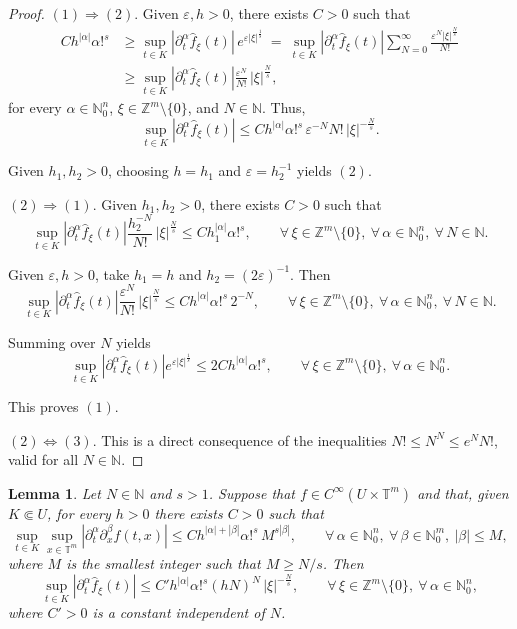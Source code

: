 \documentclass[11pt,reqno]{amsart}
\numberwithin{equation}{section}
\newtheorem{lemma}[theorem]{Lemma}
\begin{document}
\begin{proof}
	\noindent
	\((1)\Rightarrow(2)\).
	Given \(\varepsilon,h>0\), there exists \(C>0\) such that
	\begin{align*}
		Ch^{|\alpha|}\alpha!^s
		&\geq
		\sup_{t\in K}|\partial_t^\alpha\widehat{f}_\xi(t)|\,e^{\varepsilon|\xi|^{\frac{1}{s}}}\ =\ 
		\sup_{t\in K}|\partial_t^\alpha\widehat{f}_\xi(t)|
		\sum_{N=0}^{\infty}\frac{\varepsilon^N|\xi|^{\frac{N}{s}}}{N!}\\
		&\geq
		\sup_{t\in K}|\partial_t^\alpha\widehat{f}_\xi(t)|
		\frac{\varepsilon^{N}}{N!}\,|\xi|^{\frac{N}{s}},
	\end{align*}
	for every \(\alpha\in\mathbb{N}_0^n\), \(\xi\in\mathbb{Z}^m\setminus\{0\}\), and \(N\in\mathbb{N}\).
	Thus,
	\[
	\sup_{t\in K}|\partial_t^\alpha\widehat{f}_\xi(t)|
	\leq
	Ch^{|\alpha|}\alpha!^s\, \varepsilon^{-N}N!\,|\xi|^{-\frac{N}{s}}.
	\]
	
	Given \(h_1,h_2>0\), choosing \(h=h_1\) and \(\varepsilon=h_2^{-1}\) yields \((2)\).
	
	\medskip
	\noindent
	\((2)\Rightarrow(1)\).
	Given \(h_1,h_2>0\), there exists \(C>0\) such that
	\[
	\sup_{t\in K}|\partial_t^\alpha\widehat{f}_\xi(t)|
	\frac{h_2^{-N}}{N!}\,|\xi|^{\frac{N}{s}}
	\leq
	Ch_1^{|\alpha|}\alpha!^s,\qquad\forall\,\xi\in\mathbb{Z}^m\setminus\{0\},\ \forall\,\alpha\in\mathbb{N}_0^n,\ \forall\, N\in\mathbb{N}.
	\]
	
	Given \(\varepsilon,h>0\), take \(h_1=h\) and \(h_2=(2\varepsilon)^{-1}\). Then
	\[
	\sup_{t\in K}|\partial_t^\alpha\widehat{f}_\xi(t)|
	\frac{\varepsilon^{N}}{N!}\,|\xi|^{\frac{N}{s}}
	\leq
	Ch^{|\alpha|}\alpha!^s\,2^{-N},\qquad\forall\,\xi\in\mathbb{Z}^m\setminus\{0\},\ \forall\,\alpha\in\mathbb{N}_0^n,\ \forall\, N\in\mathbb{N}.
	\]
	
	Summing over \(N\) yields
	\[
	\sup_{t\in K}|\partial_t^\alpha\widehat{f}_\xi(t)|
	e^{\varepsilon|\xi|^{\frac{1}{s}}}
	\leq
	2Ch^{|\alpha|}\alpha!^s,\qquad\forall\,\xi\in\mathbb{Z}^m\setminus\{0\},\ \forall\,\alpha\in\mathbb{N}_0^n.
	\]
	
	This proves \((1)\).
	
	\medskip
	\noindent
	\((2)\Leftrightarrow(3)\).
	This is a direct consequence of the inequalities
	\(N!\leq N^N \leq e^N N!\), valid for all \(N\in\mathbb{N}\).
\end{proof}

\begin{lemma}\label{lemma_fourier_aux_b}
	Let \(N\in\mathbb{N}\) and \(s>1\).
	Suppose that \(f\in C^\infty(U\times\mathbb{T}^m)\) and that, given \(K\Subset U\), for every \(h>0\) there exists \(C>0\) such that
	\[
	\sup_{t\in K}\sup_{x\in\mathbb{T}^m}|\partial_t^\alpha\partial_x^\beta f(t,x)|
	\leq
	Ch^{|\alpha|+|\beta|}\alpha!^s\, M^{s|\beta|},\qquad \forall\,\alpha\in\mathbb{N}_0^n,\ \forall\,\beta\in\mathbb{N}_0^m,\ |\beta|\leq M,
	\]
	where \(M\) is the smallest integer such that \(M\geq N/s\). Then
	\[
	\sup_{t\in K}|\partial_t^\alpha\widehat{f}_\xi(t)|
	\leq
	C'h^{|\alpha|}\alpha!^s (hN)^N\, |\xi|^{-\frac{N}{s}},\qquad \forall\,\xi\in\mathbb{Z}^m\setminus\{0\},\  \forall\,\alpha\in\mathbb{N}_0^n,
	\]
	where \(C'>0\) is a constant independent of \(N\).
\end{lemma}
\end{document}
